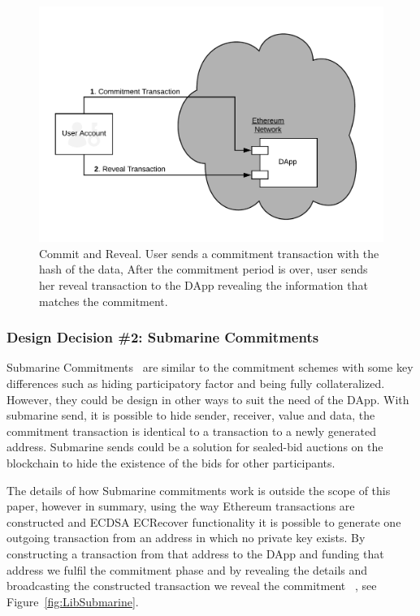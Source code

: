 \begin{figure}[h]
\centering
\includegraphics[width=0.5\linewidth]{figures/commit-reveal.png}
\caption{ Commit and Reveal. User sends a commitment transaction with the hash of the data, After the commitment period is over, user sends her reveal transaction to the DApp revealing the information that matches the commitment. \label{fig:commitReveal}}
\end{figure}

\subsubsection{Design Decision \#2: Submarine Commitments\newline}
Submarine Commitments~\cite{breidenbach2018enter, submarinesendHD} are similar to the commitment schemes with some key differences such as hiding participatory factor and being fully collateralized. However, they could be design in other ways to suit the need of the DApp. With submarine send, it is possible to hide sender, receiver, value and data, the commitment transaction is identical to a transaction to a newly generated address. Submarine sends could be a solution for sealed-bid auctions on the blockchain to hide the existence of the bids for other participants. 

The details of how Submarine commitments work is outside the scope of this paper, however in summary, using the way Ethereum transactions are constructed and ECDSA ECRecover functionality it is possible to generate one outgoing transaction from an address in which no private key exists. By constructing a transaction from that address to the DApp and funding that address we fulfil the commitment phase and by revealing the details and broadcasting the constructed transaction we reveal the commitment ~\cite{libsubmarine}, see Figure~\ref{fig:LibSubmarine}. 


